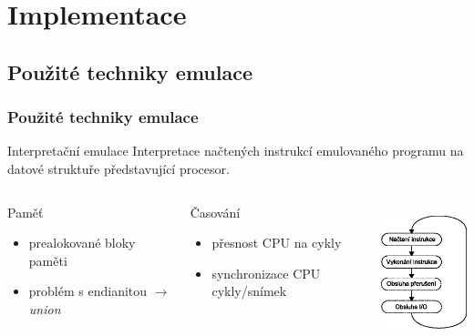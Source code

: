 \documentclass[10pt]{beamer}
\begin{document}
\section{Implementace}

\subsection{Použité techniky emulace}
\begin{frame}
\frametitle{Použité techniky emulace}
\begin{alertblock}{Interpretační emulace}
Interpretace načtených instrukcí emulovaného programu na datové struktuře
představující procesor.
\end{alertblock}
\vglue 2mm
\begin{columns}
	\begin{block}{Paměť}
	\begin{itemize}
		\item prealokované bloky paměti
		\item problém s endianitou $\rightarrow$ {\em union}
	\end{itemize}
	\end{block}
	\begin{block}{Časování}
	\begin{itemize}
		\item přesnost CPU na cykly
		\item synchronizace CPU cykly/snímek
	\end{itemize}
	\end{block}
	\begin{center}
		\includegraphics[height=4cm]{fig/anal_interpret}
	\end{center}
\end{columns}
\end{frame}
\end{document}
